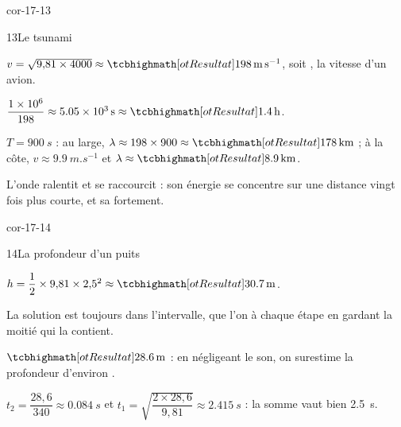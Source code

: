 \begin{blocLivre}{cor-17-13}
\begin{corrige}{13}{Le tsunami}
\begin{questions}
\item $v=\sqrt{9{,}81\times4000}\approx\res{\qty{198}{m.s^{-1}}}$, soit , la vitesse d'un avion.
\item $\dfrac{\num{1e6}}{198}\approx\qty{5,05e3}{s}\approx\res{\qty{1,4}{h}}$.
\item $T=\qty{900}{s}$ : au large, $\lambda\approx198\times900\approx\res{\qty{178}{km}}$ ; à la côte, $v\approx\qty{9,9}{m.s^{-1}}$ et $\lambda\approx\res{\qty{8,9}{km}}$.
\item L'onde ralentit et se raccourcit : son énergie se concentre sur une distance vingt fois plus courte, et sa  fortement.
\end{questions}
\end{corrige}
\end{blocLivre}
\begin{blocLivre}{cor-17-14}
\begin{corrige}{14}{La profondeur d'un puits}
\begin{questions}
\item $h=\dfrac{1}{2}\times9{,}81\times2{,}5^2\approx\res{\qty{30,7}{m}}$.
\item La solution est toujours dans l'intervalle, que l'on  à chaque étape en gardant la moitié qui la contient.
\item $\res{\qty{28,6}{m}}$ : en négligeant le son, on surestime la profondeur d'environ .
\item $t_2=\dfrac{28{,}6}{340}\approx\qty{0,084}{s}$ et $t_1=\sqrt{\dfrac{2\times28{,}6}{9{,}81}}\approx\qty{2,415}{s}$ : la somme vaut bien \qty{2,5}{s}.
\end{questions}
\end{corrige}
\end{blocLivre}
